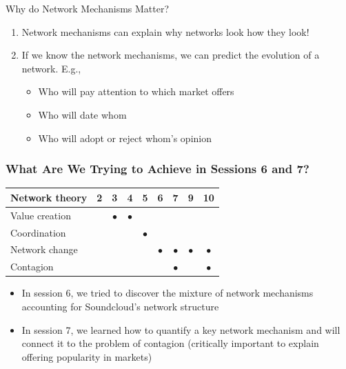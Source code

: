 \documentclass[notes, aspectratio=1610]{beamer}
\begin{document}
\begin{frame}{Why do Network Mechanisms Matter?}{}
	\begin{enumerate}
		\item Network mechanisms can explain why networks look how 
		they look!
		\item If we know the network mechanisms, we can predict the
		evolution of a network. E.g.,
		\begin{itemize}
			\item 
			Who will pay attention to which market offers
			\item 
			Who will date whom
			\item 
			Who will adopt or reject whom's opinion
		\end{itemize}
	\end{enumerate}
\end{frame}

\begin{frame}
	\frametitle{What Are We Trying to Achieve in Sessions 6 and 7?}
	\begin{table}
		\begin{tabular}[c]{l|c|c|c|c|c|c|c|c}
			\textbf{Network theory} & 
			\textbf{2} & 
			\textbf{3} & 
			\textbf{4} & 
			\textbf{5} & 
			\textbf{6} & 
			\textbf{7} & 
			\textbf{9} & 
			\textbf{10}\\
			\hline
			Value creation &  & $\bullet$ & $\bullet$ &  &  &  &  & \\	
			Coordination &  &  &  & $\bullet$ &  &  &  & \\	
			Network change &  &  &  &  & $\bullet$ & $\bullet$ & $\bullet$ & $\bullet$\\	
			Contagion &  &  &  &  &  & $\bullet$ &  & $\bullet$ \\	
		\end{tabular}
	\end{table}

	\pause

	\begin{itemize}
		\item In session 6, we tried to discover the 
		mixture of network 
		mechanisms accounting for Soundcloud's network structure
		\pause
		\item In session 7, we learned how to quantify a key 
		network mechanism and will connect it to the problem 
		of contagion (critically important to explain offering 
		popularity in markets)
	\end{itemize}
\end{frame}
\end{document}
